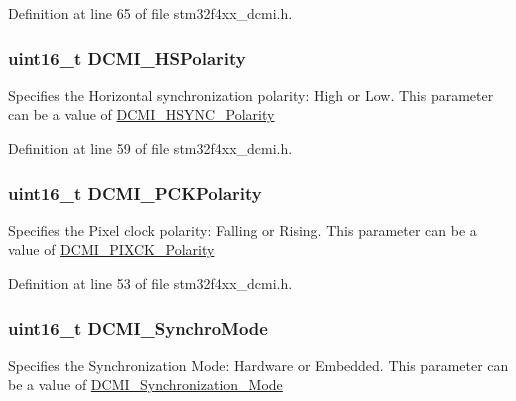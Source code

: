 Definition at line 65 of file stm32f4xx\-\_\-dcmi.\-h.

\hypertarget{struct_d_c_m_i___init_type_def_a4da83634b419ef959b40963b659df5e7}{
\subsubsection[{D\-C\-M\-I\-\_\-\-H\-S\-Polarity}]{\setlength{\rightskip}{0pt plus 5cm}uint16\-\_\-t D\-C\-M\-I\-\_\-\-H\-S\-Polarity}}\label{struct_d_c_m_i___init_type_def_a4da83634b419ef959b40963b659df5e7}
Specifies the Horizontal synchronization polarity\-: High or Low. This parameter can be a value of \hyperlink{group___d_c_m_i___h_s_y_n_c___polarity}{D\-C\-M\-I\-\_\-\-H\-S\-Y\-N\-C\-\_\-\-Polarity} 

Definition at line 59 of file stm32f4xx\-\_\-dcmi.\-h.

\hypertarget{struct_d_c_m_i___init_type_def_a5b8b15115122759a1aca13b0894d1aad}{
\subsubsection[{D\-C\-M\-I\-\_\-\-P\-C\-K\-Polarity}]{\setlength{\rightskip}{0pt plus 5cm}uint16\-\_\-t D\-C\-M\-I\-\_\-\-P\-C\-K\-Polarity}}\label{struct_d_c_m_i___init_type_def_a5b8b15115122759a1aca13b0894d1aad}
Specifies the Pixel clock polarity\-: Falling or Rising. This parameter can be a value of \hyperlink{group___d_c_m_i___p_i_x_c_k___polarity}{D\-C\-M\-I\-\_\-\-P\-I\-X\-C\-K\-\_\-\-Polarity} 

Definition at line 53 of file stm32f4xx\-\_\-dcmi.\-h.

\hypertarget{struct_d_c_m_i___init_type_def_a8028aed76d7b153d217f06f3545c6e5a}{
\subsubsection[{D\-C\-M\-I\-\_\-\-Synchro\-Mode}]{\setlength{\rightskip}{0pt plus 5cm}uint16\-\_\-t D\-C\-M\-I\-\_\-\-Synchro\-Mode}}\label{struct_d_c_m_i___init_type_def_a8028aed76d7b153d217f06f3545c6e5a}
Specifies the Synchronization Mode\-: Hardware or Embedded. This parameter can be a value of \hyperlink{group___d_c_m_i___synchronization___mode}{D\-C\-M\-I\-\_\-\-Synchronization\-\_\-\-Mode} 

